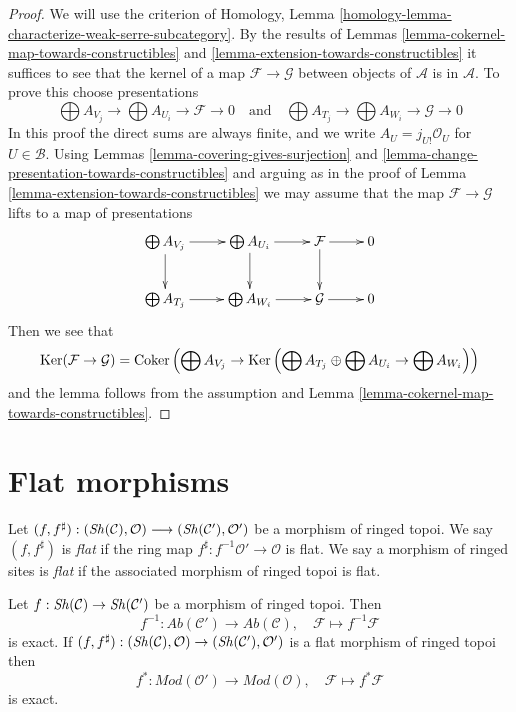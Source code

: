\begin{proof}
We will use the criterion of
Homology, Lemma \ref{homology-lemma-characterize-weak-serre-subcategory}.
By the results of
Lemmas \ref{lemma-cokernel-map-towards-constructibles} and
\ref{lemma-extension-towards-constructibles}
it suffices to see that the kernel of a map $\mathcal{F} \to \mathcal{G}$
between objects of $\mathcal{A}$ is in $\mathcal{A}$. To prove this
choose presentations
$$
\bigoplus A_{V_j} \to \bigoplus A_{U_i} \to \mathcal{F} \to 0
\quad\text{and}\quad
\bigoplus A_{T_j} \to \bigoplus A_{W_i} \to \mathcal{G} \to 0
$$
In this proof the direct sums are always finite, and
we write $A_U = j_{U!}\mathcal{O}_U$ for $U \in \mathcal{B}$.
Using Lemmas \ref{lemma-covering-gives-surjection} and
\ref{lemma-change-presentation-towards-constructibles}
and arguing as in the proof of
Lemma \ref{lemma-extension-towards-constructibles}
we may assume that the map $\mathcal{F} \to \mathcal{G}$
lifts to a map of presentations
$$
\xymatrix{
\bigoplus A_{V_j} \ar[r] \ar[d] &
\bigoplus A_{U_i} \ar[r] \ar[d] &
\mathcal{F} \ar[r] \ar[d] & 0 \\
\bigoplus A_{T_j} \ar[r] &
\bigoplus A_{W_i} \ar[r] &
\mathcal{G} \ar[r] & 0
}
$$
Then we see that
$$
\mathop{\mathrm{Ker}}(\mathcal{F} \to \mathcal{G}) =
\mathop{\mathrm{Coker}}\left(\bigoplus A_{V_j} \to
\mathop{\mathrm{Ker}}\left(
\bigoplus A_{T_j} \oplus \bigoplus A_{U_i} \to \bigoplus A_{W_i}\right)\right)
$$
and the lemma follows from the assumption and
Lemma \ref{lemma-cokernel-map-towards-constructibles}.
\end{proof}








\section{Flat morphisms}
\label{section-flat-morphisms}

\begin{definition}
\label{definition-flat-morphism}
Let
$(f, f^\sharp) :
(\mathop{\mathit{Sh}}\nolimits(\mathcal{C}), \mathcal{O})
\longrightarrow
(\mathop{\mathit{Sh}}\nolimits(\mathcal{C}'), \mathcal{O}')$
be a morphism of ringed topoi. We say $(f, f^\sharp)$ is
{\it flat} if the ring map $f^\sharp : f^{-1}\mathcal{O}' \to \mathcal{O}$
is flat. We say a morphism of ringed sites is {\it flat}
if the associated morphism of ringed topoi is flat.
\end{definition}

\begin{lemma}
\label{lemma-flat-pullback-exact}
Let $f : \mathop{\mathit{Sh}}\nolimits(\mathcal{C}) \to \mathop{\mathit{Sh}}\nolimits(\mathcal{C}')$
be a morphism of ringed topoi. Then
$$
f^{-1} : \textit{Ab}(\mathcal{C}') \longrightarrow \textit{Ab}(\mathcal{C}),
\quad
\mathcal{F} \longmapsto f^{-1}\mathcal{F}
$$
is exact. If
$(f, f^\sharp) :
(\mathop{\mathit{Sh}}\nolimits(\mathcal{C}), \mathcal{O})
\to
(\mathop{\mathit{Sh}}\nolimits(\mathcal{C}'), \mathcal{O}')$
is a flat morphism of ringed topoi then
$$
f^* : \textit{Mod}(\mathcal{O}') \longrightarrow \textit{Mod}(\mathcal{O}),
\quad
\mathcal{F} \longmapsto f^*\mathcal{F}
$$
is exact.
\end{lemma}

